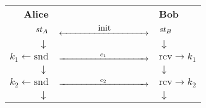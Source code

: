 \begin{tabular}{rC{4cm}l}
    \textbf{Alice} &  & \textbf{Bob} \\
    $\mathit{st}_A$ & $\xleftrightarrow{\makebox[3.5cm]{init}}$ & $\mathit{st}_B$ \\
    $\downarrow$ &  & $\downarrow$ \\ 
    $k_1\gets\mathrm{snd}$ & $\xrightarrow{\mathmakebox[3.5cm]{c_1}}$ & $\mathrm{rcv}\to k_1$ \\
    $\downarrow$ &  & $\downarrow$ \\  
    $k_2\gets\mathrm{snd}$ & $\xrightarrow{\mathmakebox[3.5cm]{c_2}}$ & $\mathrm{rcv}\to k_2$ \\
    $\downarrow$ &  & $\downarrow$ \\
\end{tabular}